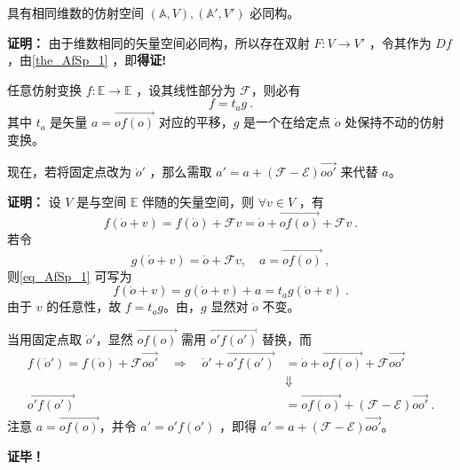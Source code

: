 \begin{corollary}{}
具有相同维数的仿射空间 $(\mathbb A,V),(\mathbb A',V')$ 必同构。
\end{corollary}
\textbf{证明：} 由于维数相同的矢量空间必同构，所以存在双射 $F:V\rightarrow V'$ ，令其作为 $Df$ ，由\autoref{the_AfSp_1} ，即\textbf{得证!}
\begin{theorem}{}
任意仿射变换 $f:\mathbb E\rightarrow\mathbb E$ ，设其线性部分为 $\mathcal F$，则必有
\begin{equation}
f=t_a g~.
\end{equation}
其中 $t_a$ 是矢量 $a=\overrightarrow{of(o)}$ 对应的平移，$g$ 是一个在给定点 $\dot o$ 处保持不动的仿射变换。

现在，若将固定点改为 $\dot o'$ ，那么需取 $a'=a+(\mathcal F-\mathcal E)\overrightarrow{oo'}$ 来代替 $a$。
\end{theorem}

\textbf{证明：} 设 $V$ 是与空间 $\mathbb E$ 伴随的矢量空间，则 $\forall v\in V$ ，有
\begin{equation}\label{eq_AfSp_1}
f(\dot o+v)=f(\dot o)+\mathcal F v=\dot o+\overrightarrow{of(o)}+\mathcal F v~.
\end{equation}
若令
\begin{equation}
g(\dot o+v)=\dot o+\mathcal F v,\quad a=\overrightarrow{of(o)}~,
\end{equation}
则\autoref{eq_AfSp_1} 可写为
\begin{equation}
f(\dot o+v)=g(\dot o+v)+a=t_a g(\dot o+v)~.
\end{equation}
由于 $v$ 的任意性，故 $f=t_ag$。由，$g$ 显然对 $\dot o$ 不变。

当用固定点取 $\dot o'$，显然 $\overrightarrow{of(o)}$ 需用 $\overrightarrow{o'f(o')}$ 替换，而
\begin{equation}
\begin{aligned}
f(\dot o')=f(\dot o)+\mathcal F \overrightarrow{oo'}\quad\Rightarrow \quad \dot o'+\overrightarrow{o'f(o')}&=\dot o+\overrightarrow{of(o)}+\mathcal F \overrightarrow{oo'}\\
&\Downarrow\\
\overrightarrow{o'f(o')}&=\overrightarrow{of(o)}+(\mathcal F-\mathcal E)\overrightarrow{oo'}~.
\end{aligned}
\end{equation}
注意 $a=\overrightarrow{of(o)}$，并令 $a'=o'f(o')$ ，即得 $a'=a+(\mathcal F-\mathcal E)\overrightarrow{oo'}$。

\textbf{证毕！}
